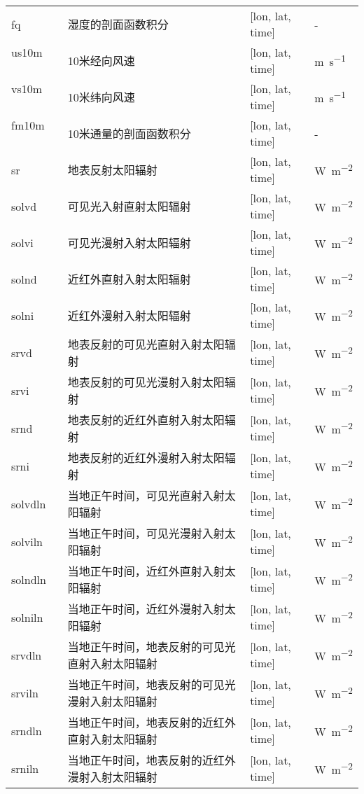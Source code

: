 {\begin{longtable}[htbp]{lp{}p{}l}
fq ~ ~ ~ & 湿度的剖面函数积分 & {[}lon, lat, time{]}  & - \\
us10m~ ~ & 10米经向风速 & {[}lon, lat, time{]}  & \unit{m.s^{-1}} \\
vs10m~ ~ & 10米纬向风速 & {[}lon, lat, time{]}  & \unit{m.s^{-1}} \\
fm10m~ ~ & 10米通量的剖面函数积分 & {[}lon, lat, time{]}  & - \\
sr ~ ~ ~ & 地表反射太阳辐射 & {[}lon, lat, time{]}  & \unit{W.m^{-2}} \\
solvd~ ~ & 可见光入射直射太阳辐射 & {[}lon, lat, time{]}  & \unit{W.m^{-2}} \\
solvi~ ~ & 可见光漫射入射太阳辐射 & {[}lon, lat, time{]}  & \unit{W.m^{-2}} \\
solnd~ ~ & 近红外直射入射太阳辐射 & {[}lon, lat, time{]}  & \unit{W.m^{-2}} \\
solni~ ~ & 近红外漫射入射太阳辐射 & {[}lon, lat, time{]}  & \unit{W.m^{-2}} \\
srvd ~ ~ & 地表反射的可见光直射入射太阳辐射 & {[}lon, lat, time{]}  & \unit{W.m^{-2}} \\
srvi ~ ~ & 地表反射的可见光漫射入射太阳辐射 & {[}lon, lat, time{]}  & \unit{W.m^{-2}} \\
srnd ~ & 地表反射的近红外直射入射太阳辐射 & {[}lon, lat, time{]}  & \unit{W.m^{-2}} \\
srni ~ & 地表反射的近红外漫射入射太阳辐射 & {[}lon, lat, time{]}  & \unit{W.m^{-2}} \\
solvdln~ & 当地正午时间，可见光直射入射太阳辐射 & {[}lon, lat,
time{]}  & \unit{W.m^{-2}} \\
solviln~ & 当地正午时间，可见光漫射入射太阳辐射 & {[}lon, lat,
time{]}  & \unit{W.m^{-2}} \\
solndln~ & 当地正午时间，近红外直射入射太阳辐射 & {[}lon, lat,
time{]}  & \unit{W.m^{-2}} \\
solniln~ & 当地正午时间，近红外漫射入射太阳辐射 & {[}lon, lat,
time{]}  & \unit{W.m^{-2}} \\
srvdln ~ & 当地正午时间，地表反射的可见光直射入射太阳辐射 & {[}lon, lat,
time{]}  & \unit{W.m^{-2}} \\
srviln ~ & 当地正午时间，地表反射的可见光漫射入射太阳辐射 & {[}lon, lat,
time{]}  & \unit{W.m^{-2}} \\
srndln ~ & 当地正午时间，地表反射的近红外直射入射太阳辐射 & {[}lon, lat,
time{]}  & \unit{W.m^{-2}} \\
srniln~ & 当地正午时间，地表反射的近红外漫射入射太阳辐射 & {[}lon, lat,
time{]}  & \unit{W.m^{-2}} \\


\end{longtable}}
